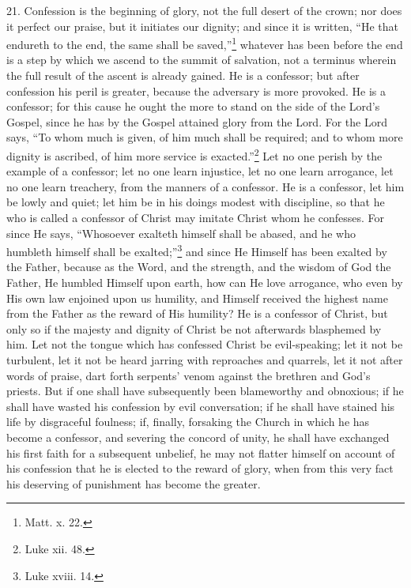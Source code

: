 21. Confession is the beginning of glory, not the full desert of the crown; nor does it perfect our praise, but it initiates our dignity; and since it is written, “He that endureth to the end, the same shall be saved,”\footnote{Matt. x. 22.} whatever has been before the end is a step by which we ascend to the summit of salvation, not a terminus wherein the full result of the ascent is already gained. He is a confessor; but after confession his peril is greater, because the adversary is more provoked. He is a confessor; for this cause he ought the more to stand on the side of the Lord’s Gospel, since he has by the Gospel attained glory from the Lord. For the Lord says, “To whom much is given, of him much shall be required; and to whom more dignity is ascribed, of him more service is exacted.”\footnote{Luke xii. 48.} Let no one perish by the example of a confessor; let no one learn injustice, let no one learn arrogance, let no one learn treachery, from the manners of a confessor. He is a confessor, let him be lowly and quiet; let him be in his doings modest with discipline, so that he who is called a confessor of Christ may imitate Christ whom he confesses. For since He says, “Whosoever exalteth himself shall be abased, and he who humbleth himself shall be exalted;”\footnote{Luke xviii. 14.} and since He Himself has been exalted by the Father, because as the Word, and the strength, and the wisdom of God the Father, He humbled Himself upon earth, how can He love arrogance, who even by His own law enjoined upon us humility, and Himself received the highest name from the Father as the reward of His humility? He is a confessor of Christ, but only so if the majesty and dignity of Christ be not afterwards blasphemed by him. Let not the tongue which has confessed Christ be evil-speaking; let it not be turbulent, let it not be heard jarring with reproaches and quarrels, let it not after words of praise, dart forth serpents’ venom against the brethren and God’s priests. But if one shall have subsequently been blameworthy and obnoxious; if he shall have wasted his confession by evil conversation; if he shall have stained his life by disgraceful foulness; if, finally, forsaking the Church in which he has become a confessor, and severing the concord of unity, he shall have exchanged his first faith for a subsequent unbelief, he may not flatter himself on account of his confession that he is elected to the reward of glory, when from this very fact his deserving of punishment has become the greater.

